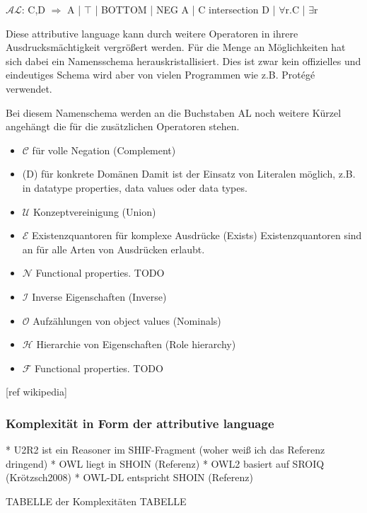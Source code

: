 $\mathcal{AL}$: C,D $\Longrightarrow$ A | $\top$ | BOTTOM | NEG A | C intersection D | $\forall$r.C | $\exists$r

Diese attributive language kann durch weitere Operatoren in ihrere Ausdrucksmächtigkeit vergrößert werden. Für die Menge an Möglichkeiten hat sich dabei ein Namensschema herauskristallisiert. Dies ist zwar kein offizielles und eindeutiges Schema wird aber von vielen Programmen wie z.B. Protégé verwendet.

Bei diesem Namenschema werden an die Buchstaben AL noch weitere Kürzel angehängt die für die zusätzlichen Operatoren stehen.
\begin{itemize}
  \item $\mathcal{C}$ für volle Negation (Complement)
  \item (D) für konkrete Domänen\newline
Damit ist der Einsatz von Literalen möglich, z.B. in datatype properties, data values oder data types.
  \item $\mathcal{U}$ Konzeptvereinigung (Union)
  \item $\mathcal{E}$ Existenzquantoren für komplexe Ausdrücke (Exists)\newline
Existenzquantoren sind an für alle Arten von Ausdrücken erlaubt.
  \item $\mathcal{N}$ Functional properties. TODO
  \item $\mathcal{I}$ Inverse Eigenschaften (Inverse)
  \item $\mathcal{O}$ Aufzählungen von object values (Nominals)
  \item $\mathcal{H}$ Hierarchie von Eigenschaften (Role hierarchy)
  \item $\mathcal{F}$ Functional properties. TODO
\end{itemize} [ref wikipedia]

\subsubsection{Komplexität in Form der attributive language}
 * U2R2 ist ein Reasoner im SHIF-Fragment (woher weiß ich das Referenz dringend)
 * OWL liegt in SHOIN (Referenz)
 * OWL2 basiert auf SROIQ (Krötzsch2008)
 * OWL-DL entspricht SHOIN (Referenz)

TABELLE der Komplexitäten TABELLE



